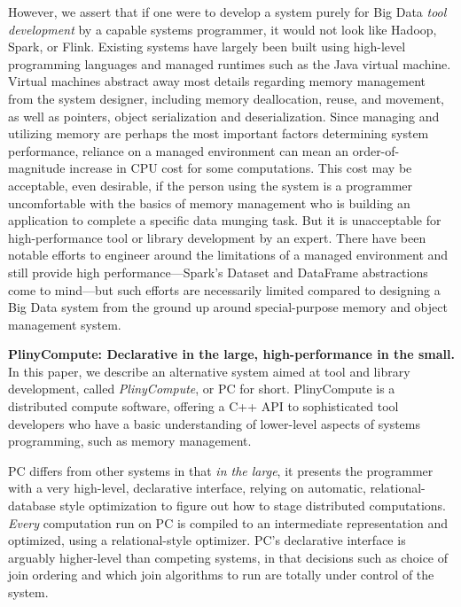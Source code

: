 However, we assert that if one were to develop a system purely for Big Data \emph{tool development} 
by a capable systems programmer,
it would not look like Hadoop, Spark, or Flink.
Existing systems have largely been built using high-level programming languages and managed runtimes such as the Java 
virtual machine.  Virtual machines abstract away
most details regarding memory management
from the system designer, including memory deallocation, reuse, and movement, as well as pointers,
object serialization and deserialization.
Since managing and utilizing memory are perhaps the most important factors determining system performance, reliance
on a managed environment can mean an order-of-magnitude increase in CPU cost for some computations.  
This cost may be acceptable, even desirable, if the person using the system
is a programmer uncomfortable with the basics of memory management who is
building an application to complete a specific data munging task.  But it is unacceptable for high-performance tool
or library development by an expert.
There have been notable efforts to engineer around the limitations of a managed environment and still provide
high performance---Spark's Dataset and
DataFrame abstractions come to mind---but such efforts are necessarily limited compared to
designing a Big Data system from the ground up around special-purpose
memory and object management system.

\vspace{5 pt}
\noindent
\textbf{PlinyCompute: Declarative in the large, high-performance in the small.}
In this paper, we describe an alternative system aimed at tool and library development, 
called \emph{PlinyCompute}, or PC for short.
PlinyCompute is a distributed compute software, offering a C++ API to
sophisticated tool developers who have a basic understanding of lower-level
aspects of systems programming, such as memory management.

PC differs from other systems in that
\emph{in the large},
it presents the programmer with a very high-level, declarative interface, relying on automatic, relational-database style
optimization to figure out how to stage distributed computations.
\emph{Every} computation run on PC is compiled to an intermediate representation and optimized, using a relational-style optimizer.  
PC's declarative interface is arguably higher-level than competing systems, in that decisions such as choice of join ordering and which
join algorithms to run are
totally under control of the system. 

